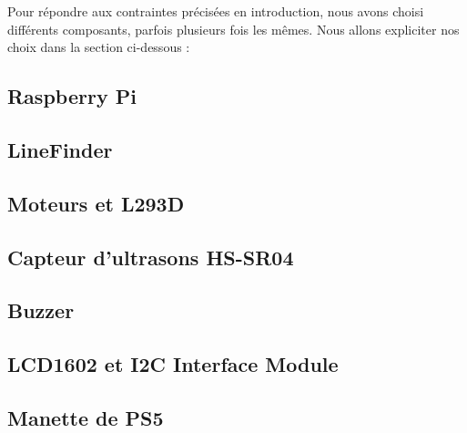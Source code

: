 Pour répondre aux contraintes précisées en introduction, nous avons choisi différents composants, parfois plusieurs fois les mêmes. Nous allons expliciter nos choix dans la section ci-dessous :

\subsection{Raspberry Pi}
\subsection{LineFinder}
\subsection{Moteurs et L293D}
\subsection{Capteur d'ultrasons HS-SR04}
\subsection{Buzzer}
\subsection{LCD1602 et I2C Interface Module}
\subsection{Manette de PS5}